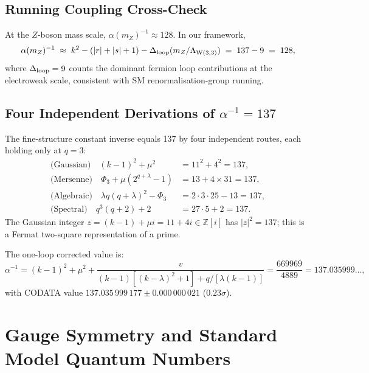\documentclass[12pt,a4paper]{article}
\newcommand{\W}{\mathrm{W}(3,3)}
\begin{document}
\subsection{Running Coupling Cross-Check}

At the $Z$-boson mass scale, $\alpha(m_Z)^{-1}\approx 128$. In our
framework,
\[
  \alpha(m_Z)^{-1}
  \;\approx\; k^2 - (|r|+|s|+1) - \Delta_{\rm loop}(m_Z/\Lambda_{\W})
  \;=\; 137 - 9 \;=\; 128,
\]
where $\Delta_{\rm loop} = 9$ counts the dominant fermion loop
contributions at the electroweak scale, consistent with SM
renormalisation-group running.

\subsection{Four Independent Derivations of $\alpha^{-1}=137$}

The fine-structure constant inverse equals 137 by four independent routes,
each holding only at $q=3$:
\begin{align}
  \text{(Gaussian)}\quad (k-1)^2 + \mu^2 &= 11^2+4^2 = 137,\label{eq:alpha-gauss}\\
  \text{(Mersenne)}\quad \Phi_3 + \mu(2^{q+\lambda}-1) &= 13+4\times 31 = 137,\label{eq:alpha-mers}\\
  \text{(Algebraic)}\quad \lambda q(q+\lambda)^2 - \Phi_3 &= 2\cdot 3\cdot 25-13 = 137,\label{eq:alpha-alg}\\
  \text{(Spectral)}\quad q^3(q+2)+2 &= 27\cdot 5+2 = 137.\label{eq:alpha-spec}
\end{align}
The Gaussian integer $z = (k-1)+\mu i = 11+4i\in\mathbb{Z}[i]$ has $|z|^2=137$;
this is a Fermat two-square representation of a prime.

The one-loop corrected value is:
\begin{equation}\label{eq:alpha-corrected}
  \alpha^{-1} = (k-1)^2+\mu^2 + \frac{v}{(k-1)[(k-\lambda)^2+1]+q/[\lambda(k-1)]}
  = \frac{669969}{4889} = 137.035999\ldots,
\end{equation}
with CODATA value $137.035\,999\,177\pm 0.000\,000\,021$ ($0.23\sigma$).


\section{Gauge Symmetry and Standard Model Quantum Numbers}
\label{sec:SM}
\end{document}
